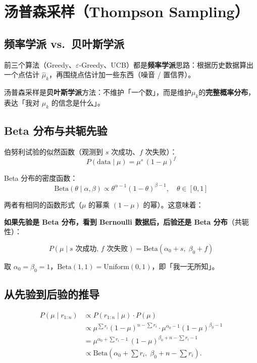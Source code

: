 \documentclass{article}
\begin{document}
\section*{汤普森采样（Thompson Sampling）}

\subsection*{频率学派 vs.\ 贝叶斯学派}

前三个算法（Greedy、$\varepsilon$-Greedy、UCB）都是\textbf{频率学派}思路：根据历史数据算出一个点估计 $\hat{\mu}_k$，再围绕点估计加一些东西（噪音 / 置信界）。

汤普森采样是\textbf{贝叶斯学派}方法：不维护「一个数」，而是维护$\mu_k$的\textbf{完整概率分布}，表达「我对 $\mu_k$ 的信念是什么」。

\subsection*{Beta 分布与共轭先验}

伯努利试验的似然函数（观测到 $s$ 次成功、$f$ 次失败）：
\[
P(\text{data} \mid \mu) = \mu^{s}\,(1-\mu)^{f}
\]

Beta 分布的密度函数：
\[
\text{Beta}(\theta \mid \alpha, \beta) \propto \theta^{\alpha-1}(1-\theta)^{\beta-1}, \quad \theta \in [0,1]
\]

两者有相同的函数形式（$\mu$ 的幂乘 $(1-\mu)$ 的幂）。这意味着：

\textbf{如果先验是 Beta 分布，看到 Bernoulli 数据后，后验还是 Beta 分布}（共轭性）：

\[
\boxed{P(\mu \mid s \text{ 次成功, } f \text{ 次失败}) = \text{Beta}(\alpha_0 + s,\; \beta_0 + f)}
\]

取 $\alpha_0 = \beta_0 = 1$，$\text{Beta}(1,1) = \text{Uniform}(0,1)$，即「我一无所知」。

\subsection*{从先验到后验的推导}

\[
\begin{aligned}
P(\mu \mid r_{1:n}) &\propto P(r_{1:n} \mid \mu) \cdot P(\mu)  \\
&\propto \mu^{\sum r_i} (1-\mu)^{n-\sum r_i} \cdot \mu^{\alpha_0-1} (1-\mu)^{\beta_0-1} \\
&= \mu^{\alpha_0 + \sum r_i - 1}\,(1-\mu)^{\beta_0 + n - \sum r_i - 1} \\
&\propto \text{Beta}\left(\alpha_0 + \sum r_i,\; \beta_0 + n - \sum r_i\right).
\end{aligned}
\]
\end{document}
